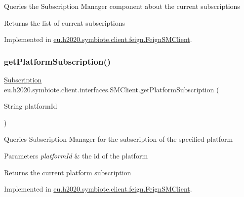 Queries the Subscription Manager component about the current subscriptions

\begin{DoxyReturn}{Returns}
the list of current subscriptions 
\end{DoxyReturn}


Implemented in \hyperlink{classeu_1_1h2020_1_1symbiote_1_1client_1_1feign_1_1FeignSMClient_a1a7e9bd000f939df425066692a5ccca4}{eu.\+h2020.\+symbiote.\+client.\+feign.\+Feign\+S\+M\+Client}.

\mbox{\label{interfaceeu_1_1h2020_1_1symbiote_1_1client_1_1interfaces_1_1SMClient_a1b8fae6186f8126666879346e752fc6c}} 
\subsubsection{\texorpdfstring{get\+Platform\+Subscription()}{getPlatformSubscription()}}
{\footnotesize\ttfamily \hyperlink{classeu_1_1h2020_1_1symbiote_1_1cloud_1_1model_1_1internal_1_1Subscription}{Subscription} eu.\+h2020.\+symbiote.\+client.\+interfaces.\+S\+M\+Client.\+get\+Platform\+Subscription (\begin{DoxyParamCaption}\item[{String}]{platform\+Id }\end{DoxyParamCaption})}

Queries Subscription Manager for the subscription of the specified platform


\begin{DoxyParams}{Parameters}
{\em platform\+Id} & the id of the platform \\
\hline
\end{DoxyParams}
\begin{DoxyReturn}{Returns}
the current platform subscription 
\end{DoxyReturn}


Implemented in \hyperlink{classeu_1_1h2020_1_1symbiote_1_1client_1_1feign_1_1FeignSMClient_a6d8bf2b5d12dcd5db1239f376cd93365}{eu.\+h2020.\+symbiote.\+client.\+feign.\+Feign\+S\+M\+Client}.

